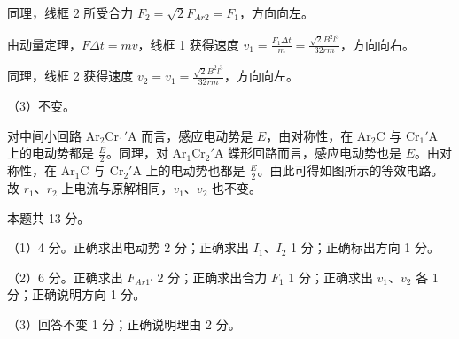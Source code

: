 \documentclass[\gkver]{gaokaozhenti}
\begin{document}
\begin{enumerate}
{同理，线框 2 所受合力 $F_{2} = \sqrt{2}F_{Ar2} = F_{1}$，方向向左。

由动量定理，$F\Delta t = mv$，线框 1 获得速度 $v_{1} = \frac{F_{1}\Delta t}{m} = \frac{\sqrt{2}B^{2}l^{3}}{32rm}$，方向向右。

同理，线框 2 获得速度 $v_{2} = v_{1} = \frac{\sqrt{2}B^{2}l^{3}}{32rm}$，方向向左。

（3）不变。

对中间小回路 Ar$_{2}$Cr$_{1}'$A 而言，感应电动势是 $E$，由对称性，在 Ar$_{2}$C 与 Cr$_{1}'$A 上的电动势都是 $\frac{E}{2}$。同理，对 Ar$_{1}$Cr$_{2}'$A 蝶形回路而言，感应电动势也是 $E$。由对称性，在 Ar$_{1}$C 与 Cr$_{2}'$A 上的电动势也都是 $\frac{E}{2}$。由此可得如图所示的等效电路。故 $r_{1}$、$r_{2}$ 上电流与原解相同，$v_{1}$、$v_{2}$ 也不变。

\onepicture[align=right, w=5.38cm]{}

本题共 13 分。

（1）4 分。正确求出电动势 2 分；正确求出 $I_{1}$、$I_{2}$ 1 分；正确标出方向 1 分。

（2）6 分。正确求出 $F_{Ar1'}$ 2 分；正确求出合力 $F_{1}$ 1 分；正确求出 $v_{1}$、$v_{2}$ 各 1 分；正确说明方向 1 分。

（3）回答不变 1 分；正确说明理由 2 分。
}

\end{enumerate}
\end{document}
